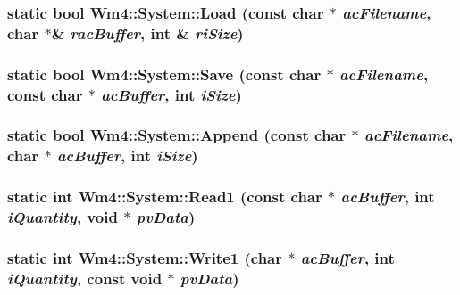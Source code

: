 \subsubsection{\setlength{\rightskip}{0pt plus 5cm}static bool Wm4::System::Load (const char $\ast$ {\em ac\-Filename}, char $\ast$\& {\em rac\-Buffer}, int \& {\em ri\-Size})\hspace{0.3cm}{\tt  [static]}}\label{classWm4_1_1System_af5d5efbf10c46fe611bfc7244594476}


\subsubsection{\setlength{\rightskip}{0pt plus 5cm}static bool Wm4::System::Save (const char $\ast$ {\em ac\-Filename}, const char $\ast$ {\em ac\-Buffer}, int {\em i\-Size})\hspace{0.3cm}{\tt  [static]}}\label{classWm4_1_1System_77e0c4429d584c7e2e3cc8dd6f56c96e}


\subsubsection{\setlength{\rightskip}{0pt plus 5cm}static bool Wm4::System::Append (const char $\ast$ {\em ac\-Filename}, char $\ast$ {\em ac\-Buffer}, int {\em i\-Size})\hspace{0.3cm}{\tt  [static]}}\label{classWm4_1_1System_45f7cb9f567a6bbb3aeab9d5318973f3}


\subsubsection{\setlength{\rightskip}{0pt plus 5cm}static int Wm4::System::Read1 (const char $\ast$ {\em ac\-Buffer}, int {\em i\-Quantity}, void $\ast$ {\em pv\-Data})\hspace{0.3cm}{\tt  [static]}}\label{classWm4_1_1System_9f9e56476a8ba5713d2bb2decb4a4ff3}


\subsubsection{\setlength{\rightskip}{0pt plus 5cm}static int Wm4::System::Write1 (char $\ast$ {\em ac\-Buffer}, int {\em i\-Quantity}, const void $\ast$ {\em pv\-Data})\hspace{0.3cm}{\tt  [static]}}\label{classWm4_1_1System_bfaa3ba89083f2366e1ed9d8c69989da}


